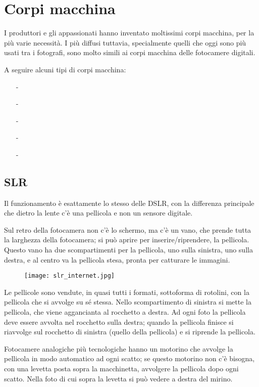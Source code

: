 \section{Corpi macchina} \label{sec:analog_corpimacchina}
I produttori e gli appassionati hanno inventato moltissimi corpi macchina, per la più varie necessità.
I più diffusi tuttavia, specialmente quelli che oggi sono più usati tra i fotografi, sono molto simili ai corpi macchina delle fotocamere digitali.

A seguire alcuni tipi di corpi macchina:
\begin{itemize}
    \item[-] 
    \item[-] 
    \item[-] 
    \item[-] 
    \item[-] 
\end{itemize}

\subsection{SLR} \label{subsec:slr}
Il funzionamento è esattamente lo stesso delle DSLR, con la differenza principale che dietro la lente c'è una pellicola e non un sensore digitale.

Sul retro della fotocamera non c'è lo schermo, ma c'è un vano, che prende tutta la larghezza della fotocamera; si può aprire per inserire/riprendere, la pellicola.
Questo vano ha due scompartimenti per la pellicola, uno sulla sinistra, uno sulla destra, e al centro va la pellicola stesa, pronta per catturare le immagini.

\begin{figure}[h]
    \centering
    \texttt{[image: slr\_internet.jpg]}
\end{figure}

Le pellicole sono vendute, in quasi tutti i formati, sottoforma di rotolini, con la pellicola che si avvolge su sé stessa.
Nello scompartimento di sinistra si mette la pellicola, che viene aggancianta al rocchetto a destra.
Ad ogni foto la pellicola deve essere avvolta nel rocchetto sulla destra; quando la pellicola finisce si riavvolge sul rocchetto di sinistra (quello della pellicola) e si riprende la pellicola.

Fotocamere analogiche più tecnologiche hanno un motorino che avvolge la pellicola in modo automatico ad ogni scatto; se questo motorino non c'è bisogna, con una levetta posta sopra la macchinetta, avvolgere la pellicola dopo ogni scatto.
Nella foto di cui sopra la levetta si può vedere a destra del mirino.


